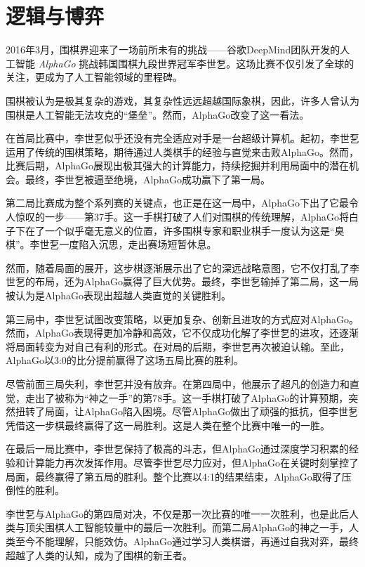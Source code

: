 \chapter{逻辑与博弈}\label{chap:game}

2016年3月，围棋界迎来了一场前所未有的挑战——谷歌DeepMind团队开发的人工智能 \emph{AlphaGo} 挑战韩国围棋九段世界冠军李世乭。这场比赛不仅引发了全球的关注，更成为了人工智能领域的里程碑。

围棋被认为是极其复杂的游戏，其复杂性远远超越国际象棋，因此，许多人曾认为围棋是人工智能无法攻克的“堡垒”。然而，AlphaGo改变了这一看法。

在首局比赛中，李世乭似乎还没有完全适应对手是一台超级计算机。起初，李世乭运用了传统的围棋策略，期待通过人类棋手的经验与直觉来击败AlphaGo。然而，比赛后期，AlphaGo展现出极其强大的计算能力，持续挖掘并利用局面中的潜在机会。最终，李世乭被逼至绝境，AlphaGo成功赢下了第一局。

第二局比赛成为整个系列赛的关键点，也正是在这一局中，AlphaGo下出了它最令人惊叹的一步——第37手。这一手棋打破了人们对围棋的传统理解，AlphaGo将白子下在了一个似乎毫无意义的位置，许多围棋专家和职业棋手一度认为这是“臭棋”。李世乭一度陷入沉思，走出赛场短暂休息。

然而，随着局面的展开，这步棋逐渐展示出了它的深远战略意图，它不仅打乱了李世乭的布局，还为AlphaGo赢得了巨大优势。最终，李世乭输掉了第二局，这一局被认为是AlphaGo表现出超越人类直觉的关键胜利。

第三局中，李世乭试图改变策略，以更加复杂、创新且进攻的方式应对AlphaGo。然而，AlphaGo表现得更加冷静和高效，它不仅成功化解了李世乭的进攻，还逐渐将局面转变为对自己有利的形式。在对局的后期，李世乭再次被迫认输。至此，AlphaGo以3:0的比分提前赢得了这场五局比赛的胜利。

尽管前面三局失利，李世乭并没有放弃。在第四局中，他展示了超凡的创造力和直觉，走出了被称为“神之一手”的第78手。这一手棋打破了AlphaGo的计算预期，突然扭转了局面，让AlphaGo陷入困境。尽管AlphaGo做出了顽强的抵抗，但李世乭凭借这一步棋最终赢得了这一局胜利。这是人类在整个比赛中唯一的一胜。

在最后一局比赛中，李世乭保持了极高的斗志，但AlphaGo通过深度学习积累的经验和计算能力再次发挥作用。尽管李世乭尽力应对，但AlphaGo在关键时刻掌控了局面，最终赢得了第五局的胜利。整个比赛以4:1的结果结束，AlphaGo取得了压倒性的胜利。

李世乭与AlphaGo的第四局对决，不仅是那一次比赛的唯一一次胜利，也是此后人类与顶尖围棋人工智能较量中的最后一次胜利。而第二局AlphaGo的神之一手，人类至今不能理解，只能效仿。AlphaGo通过学习人类棋谱，再通过自我对弈，最终超越了人类的认知，成为了围棋的新王者。

